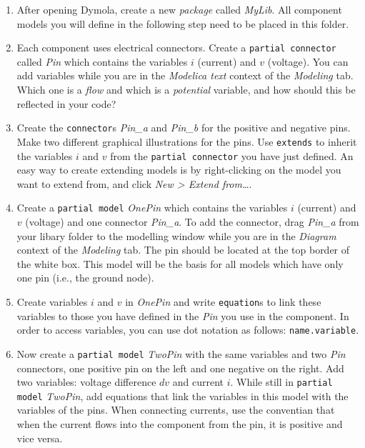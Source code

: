 \documentclass[10pt,a4paper]{article}
\begin{document}
\begin{enumerate}
	\item After opening Dymola, create a new \textit{package} called \textit{MyLib}. All component models you will define in the following step need to be placed in this folder.
	
	\item Each component uses electrical connectors. Create a \texttt{partial connector} called \textit{Pin} which contains the variables $i$ (current) and $v$ (voltage). You can add variables while you are in the \textit{Modelica text} context of the \textit{Modeling} tab. Which one is a \textit{flow} and which is a \textit{potential} variable, and how should this be reflected in your code? 
	
	\item Create the \texttt{connector}s \textit{Pin\_a} and \textit{Pin\_b} for the positive and negative pins. Make two different graphical illustrations for the pins. Use \texttt{extends} to inherit the variables $i$ and $v$ from the \texttt{partial connector} you have just defined. An easy way to create extending models is by right-clicking on the model you want to extend from, and click \textit{New > Extend from\ldots}.
	
	\item Create a \texttt{partial model} \textit{OnePin} which contains the variables $i$ (current) and $v$ (voltage) and one connector \textit{Pin\_a}. To add the connector, drag \textit{Pin\_a} from your libary folder to the modelling window while you are in the \textit{Diagram} context of the \textit{Modeling} tab. The pin should be located at the top border of the white box. This model will be the basis for all models which have only one pin (i.e., the ground node).
	
	\item Create variables $i$ and $v$ in \textit{OnePin} and write \texttt{equation}s to link these variables to those you have defined in the \textit{Pin} you use in the component. In order to access variables, you can use dot notation as follows: \texttt{name.variable}. 
	
	\item Now create a \texttt{partial model} \textit{TwoPin} with the same variables and two \textit{Pin} connectors, one positive pin on the left and one negative on the right. Add two variables: voltage difference $dv$ and current $i$. 
	While still in \texttt{partial model} \textit{TwoPin}, add equations that link the variables in this model with the variables of the pins. When connecting currents, use the conventian that when the current flows into the component from the pin, it is positive and vice versa.
	

\end{enumerate}
\end{document}
